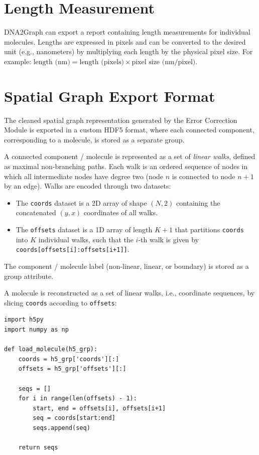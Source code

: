 \documentclass[english,12pt,a4paper]{article}
\begin{document}
	\section{Length Measurement}
	
	DNA2Graph can export a report containing length measurements for individual molecules. Lengths are expressed in pixels and can be converted to the desired unit (e.g., nanometers) by multiplying each length by the physical pixel size. For example: $ \text{length (nm)} = \text{length (pixels)} \times \text{pixel size (nm/pixel)}$.
	
	\section{Spatial Graph Export Format}
	
	The cleaned spatial graph representation generated by the Error Correction Module is exported in a custom HDF5 format, where each connected component, corresponding to a molecule, is stored as a separate group.
	
	A connected component / molecule is represented as a set of \emph{linear walks}, defined as maximal non-branching paths. Each walk is an ordered sequence of nodes in which all intermediate nodes have degree two (node $n$ is connected to node $n+1$ by an edge). Walks are encoded through two datasets:
	
	\begin{itemize}
		\item The \texttt{coords} dataset is a 2D array of shape $(N, 2)$ containing the concatenated $(y, x)$ coordinates of all walks. 
		\item The \texttt{offsets} dataset is a 1D array of length $K+1$ that partitions \texttt{coords} into $K$ individual walks, such that the $i$-th walk is given by \texttt{coords[offsets[i]:offsets[i+1]]}.
	\end{itemize}
	
	The component  / molecule label (non-linear, linear, or boundary) is stored as a group attribute.
	
	\newpage
	
	A molecule is reconstructed as a set of linear walks, i.e., coordinate sequences, by slicing \texttt{coords} according to \texttt{offsets}:
	
\begin{lstlisting}
import h5py
import numpy as np

def load_molecule(h5_grp):
	coords = h5_grp['coords'][:]
	offsets = h5_grp['offsets'][:]
	
	seqs = []
	for i in range(len(offsets) - 1):
		start, end = offsets[i], offsets[i+1]
		seq = coords[start:end]
		seqs.append(seq)
		
	return seqs
\end{lstlisting}
	
\end{document}
